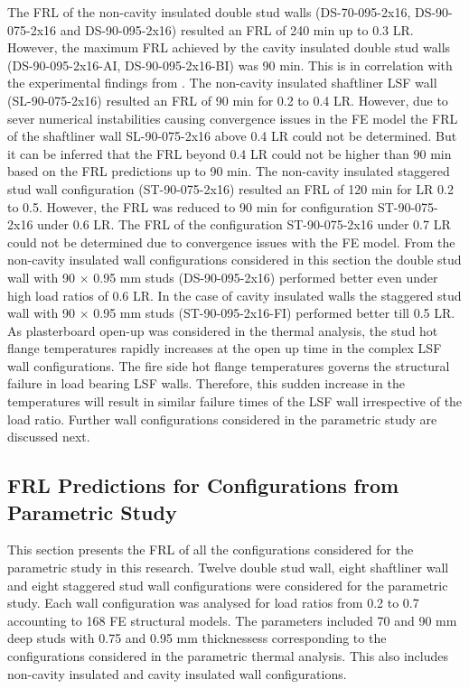 The FRL of the non-cavity insulated double stud walls (DS-70-095-2x16, DS-90-075-2x16 and DS-90-095-2x16) resulted an FRL of 240 min up to 0.3 LR. However, the maximum FRL achieved by the cavity insulated double stud walls (DS-90-095-2x16-AI, DS-90-095-2x16-BI) was 90 min. This is in correlation with the experimental findings from . The non-cavity insulated shaftliner LSF wall (SL-90-075-2x16) resulted an FRL of 90 min for 0.2 to 0.4 LR. However, due to sever numerical instabilities causing convergence issues in the FE model the FRL of the shaftliner wall SL-90-075-2x16 above 0.4 LR could not be determined. But it can be inferred that the FRL beyond 0.4 LR could not be higher than 90 min based on the FRL predictions up to 90 min. The non-cavity insulated staggered stud wall configuration (ST-90-075-2x16) resulted an FRL of 120 min for LR 0.2 to 0.5. However, the FRL was reduced to 90 min for configuration ST-90-075-2x16 under 0.6 LR. The FRL of the configuration ST-90-075-2x16 under 0.7 LR could not be determined due to convergence issues with the FE model. From the non-cavity insulated wall configurations considered in this section the double stud wall with 90 $\times$ 0.95 mm studs (DS-90-095-2x16) performed better even under high load ratios of 0.6 LR. In the case of cavity insulated walls the staggered stud wall with 90 $\times$ 0.95 mm studs (ST-90-095-2x16-FI) performed better till 0.5 LR. As plasterboard open-up was considered in the thermal analysis, the stud hot flange temperatures rapidly increases at the open up time in the complex LSF wall configurations. The fire side hot flange temperatures governs the structural failure in load bearing LSF walls. Therefore, this sudden increase in the temperatures will result in similar failure times of the LSF wall irrespective of the load ratio. Further wall configurations considered in the parametric study are discussed next.

\subsection{FRL Predictions for Configurations from Parametric Study}

This section presents the FRL of all the configurations considered for the parametric study in this research. Twelve double stud wall, eight shaftliner wall and eight staggered stud wall configurations were considered for the parametric study. Each wall configuration was analysed for load ratios from 0.2 to 0.7 accounting to 168 FE structural models. The parameters included 70 and 90 mm deep studs with 0.75 and 0.95 mm thicknessess corresponding to the configurations considered in the parametric thermal analysis. This also includes non-cavity insulated and cavity insulated wall configurations.


